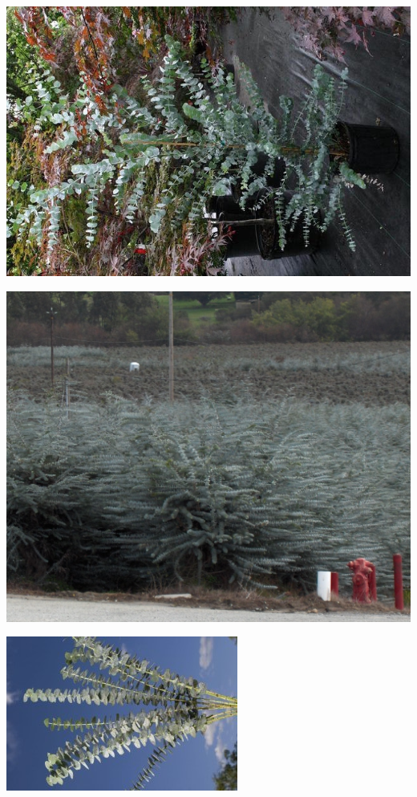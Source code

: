 \documentclass{article}
\begin{document}
\begin{center}
\includegraphics[height=0.925\paperheight]{../Eucalyptus-pot.jpg}
\end{center}
\newpage

\begin{center}
\includegraphics[height=0.925\paperheight]{../Eucalyptus_Field.jpg}
\end{center}
\newpage

\begin{center}
\includegraphics[height=0.925\paperheight]{../Euclyptus.jpg}
\end{center}
\newpage
\end{document}
